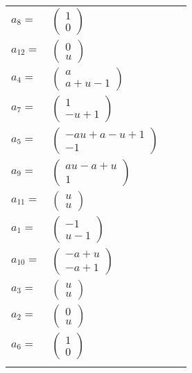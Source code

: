 \documentclass[1p]{elsarticle_modified}
\theoremstyle{definition}
\begin{document}
\begin{tabular}{m{7pt} m{180pt} m{7pt} m{180pt} }
\flushright $a_{8}=$&$\begin{pmatrix}1\\0\end{pmatrix}$ \\
\flushright $a_{12}=$&$\begin{pmatrix}0\\u\end{pmatrix}$ \\
\flushright $a_{4}=$&$\begin{pmatrix}a\\a+u-1\end{pmatrix}$ \\
\flushright $a_{7}=$&$\begin{pmatrix}1\\- u+1\end{pmatrix}$ \\
\flushright $a_{5}=$&$\begin{pmatrix}- a u+a- u+1\\-1\end{pmatrix}$ \\
\flushright $a_{9}=$&$\begin{pmatrix}a u- a+u\\1\end{pmatrix}$ \\
\flushright $a_{11}=$&$\begin{pmatrix}u\\u\end{pmatrix}$ \\
\flushright $a_{1}=$&$\begin{pmatrix}-1\\u-1\end{pmatrix}$ \\
\flushright $a_{10}=$&$\begin{pmatrix}- a+u\\- a+1\end{pmatrix}$ \\
\flushright $a_{3}=$&$\begin{pmatrix}u\\u\end{pmatrix}$ \\
\flushright $a_{2}=$&$\begin{pmatrix}0\\u\end{pmatrix}$ \\
\flushright $a_{6}=$&$\begin{pmatrix}1\\0\end{pmatrix}$\\&\end{tabular}
\end{document}
